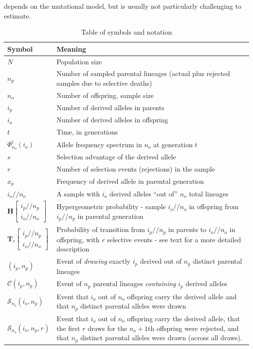 \documentclass[9pt,twocolumn,twoside,lineno]{gsajnl}
\newcommand{\dslash}{/\!\!/}
\newcommand{\Coalc}[4]{\begin{bmatrix}#1\dslash #2 \\ #3\dslash #4 \end{bmatrix}}
\newcommand{\ms}{\mathcal{S}}
\begin{document}
depends on the mutational model, but is usually not particularly challenging to estimate. 
\begin{table}
  \centering
    \begin{tabular}{l|p{}}
    Symbol & Meaning\\
    \hline
    $N$ & Population size\\
    $n_p$ & Number of sampled parental lineages (actual plus rejected samples due to selective deaths)\\
    $n_o$ & Number of offspring, sample size\\
    $i_p$ & Number of derived alleles in parents\\
    $i_o$ & Number of derived alleles in offspring\\
    $t$ & Time, in generations\\
    $\Phi_{n_o}^{t}(i_o)$ & Allele frequency spectrum in $n_o$ at generation $t$\\
    $s$ & Selection advantage of the derived allele\\
    $r$ & Number of selection events (rejections) in the sample\\
    $x_p$ & Frequency of derived allele in parental generation\\
    $i_o \dslash n_o$ & A sample with $i_o$ derived alleles ``out of'' $n_o$ total lineages\\
    $\mathbf{H}\Coalc{i_p}{n_p}{i_o}{n_o}$ &
      Hypergeometric probability - sample $i_o \dslash n_o$ in offspring from
      $i_p \dslash n_p$ in parental generation\\
    $\mathbf{T}_{r}\Coalc{i_p}{n_p}{i_o}{n_o}$ &
      Probability of transition from $i_p \dslash n_p$ in parents to $i_o \dslash n_o$ in offspring, 
      with $r$ selective events - see text for a more detailed description\\
    \hline
    $(i_p, n_p)$ & Event of \textit{drawing} exactly $i_p$ derived out of $n_p$ distinct parental lineages \\
    $\mathcal{C}(i_p, n_p)$ & Event of $n_p$ parental lineages \textit{containing} $i_p$ derived alleles \\
    $\mathcal{S}_{n_o}(i_o, n_p)$ & Event that $i_o$ out of $n_o$ offspring carry the derived allele and 
      that $n_p$ distinct parental alleles were drawn \\
    $\ms_{n_o}(i_o, n_p, r)$ & Event that  $i_o$ out of $n_o$ offspring carry the derived allele, 
      that the first $r$ draws for the
    $n_o+1$th offspring were rejected,
    and that $n_p$ distinct parental alleles were drawn (across all draws).
  \end{tabular}
  \caption{\label{tab_symbols} Table of symbols and notation}
\end{table}
\end{document}
